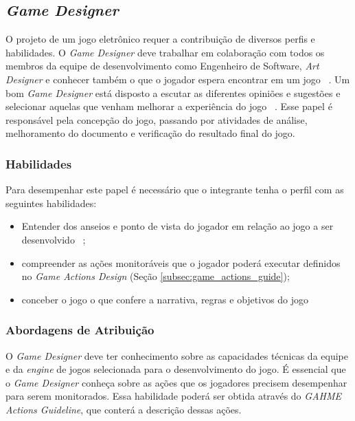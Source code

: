 \subsection{\textit{Game Designer}}\label{subsec:game_designer}
O projeto de um jogo eletrônico requer a contribuição de diversos perfis e habilidades. O \textit{Game Designer} deve trabalhar em colaboração com todos os membros da equipe de desenvolvimento como Engenheiro de Software, \textit{Art Designer} e conhecer também o que o jogador espera encontrar em um jogo ~\cite{schell2008art}. Um bom \textit{Game Designer} está disposto a escutar as diferentes opiniões e sugestões e selecionar aquelas que venham melhorar a experiência do jogo ~\cite{moore2011basics}. Esse papel é responsável pela concepção do jogo, passando por atividades de análise, melhoramento do documento e verificação do resultado final do jogo.

\subsubsection{Habilidades}
Para desempenhar este papel é necessário que o integrante tenha o perfil com as seguintes habilidades:
  \begin{itemize}
	  \item Entender dos anseios e ponto de vista do jogador em relação ao jogo a ser desenvolvido ~\cite{schell2008art};
		\item compreender as ações monitoráveis que o jogador poderá executar definidos no \textit{Game Actions Design} (Seção \ref{subsec:game_actions_guide});
		\item conceber o jogo o que confere a narrativa, regras e objetivos do jogo ~\cite{schell2008art,moore2011basics,bethke2003game}
  \end{itemize}

\subsubsection{Abordagens de Atribuição}
O \textit{Game Designer} deve ter conhecimento sobre as capacidades técnicas da equipe e da \textit{engine} de jogos selecionada para o desenvolvimento do jogo. É essencial que o \textit{Game Designer} conheça sobre as ações que os jogadores precisem desempenhar para serem monitorados. Essa habilidade poderá ser obtida através do \textit{GAHME Actions Guideline}, que conterá a descrição dessas ações.


